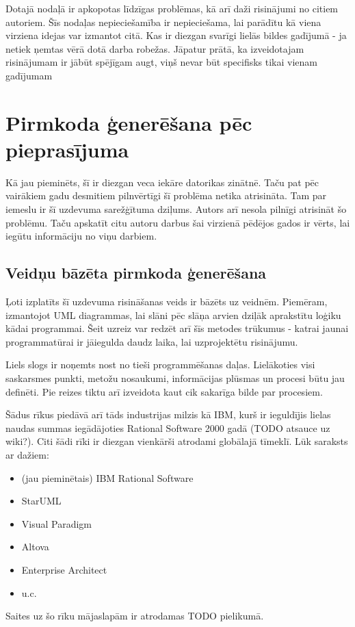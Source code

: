 Dotajā nodaļā ir apkopotas līdzīgas problēmas, kā arī daži risinājumi no citiem autoriem. Šīs nodaļas nepieciešamība ir nepieciešama, lai parādītu kā viena virziena idejas var izmantot citā. Kas ir diezgan svarīgi lielās bildes gadījumā - ja netiek ņemtas vērā dotā darba robežas. Jāpatur prātā, ka izveidotajam risinājumam ir jābūt spējīgam augt, viņš nevar būt specifisks tikai vienam gadījumam

\section{Pirmkoda ģenerēšana pēc pieprasījuma}
Kā jau pieminēts, šī ir diezgan veca iekāre datorikas zinātnē. Taču pat pēc vairākiem gadu desmitiem pilnvērtīgi šī problēma netika atrisināta. Tam par iemeslu ir šī uzdevuma sarežģītuma dziļums. Autors arī nesola pilnīgi atrisināt šo problēmu. Taču apskatīt citu autoru darbus šai virzienā pēdējos gados ir vērts, lai iegūtu informāciju no viņu darbiem.

\subsection{Veidņu bāzēta pirmkoda ģenerēšana}
Ļoti izplatīts šī uzdevuma risināšanas veids ir bāzēts uz veidnēm. Piemēram, izmantojot UML diagrammas, lai slāni pēc slāņa arvien dziļāk aprakstītu loģiku kādai programmai. Šeit uzreiz var redzēt arī šīs metodes trūkumus - katrai jaunai programmatūrai ir jāiegulda daudz laika, lai uzprojektētu risinājumu. 

Liels slogs ir noņemts nost no tieši programmēšanas daļas. Lielākoties visi saskarsmes punkti, metožu nosaukumi, informācijas plūsmas un procesi būtu jau definēti. Pie reizes tiktu arī izveidota kaut cik sakarīga bilde par procesiem.

Šādus rīkus piedāvā arī tāds industrijas milzis kā IBM, kurš ir ieguldījis lielas naudas summas iegādājoties Rational Software 2000 gadā (TODO atsauce uz wiki?).
Citi šādi rīki ir diezgan vienkārši atrodami globālajā tīmeklī. Lūk saraksts ar dažiem:
\begin{itemize}
\item (jau pieminētais) IBM Rational Software
\item StarUML
\item Visual Paradigm
\item Altova
\item Enterprise Architect
\item u.c.
\end{itemize}
Saites uz šo rīku mājaslapām ir atrodamas TODO pielikumā.

